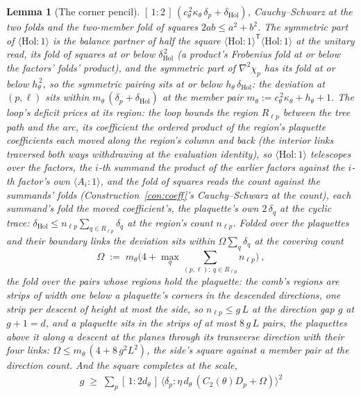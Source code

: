 \documentclass[11pt]{article}
\newtheorem{lemma}{Lemma}
\theoremstyle{definition}
\begin{document}
\begin{lemma}[The corner pencil]
$[\,1:2\,]\,(c_\theta^{\,2}\kappa_\theta\,\delta_p+\delta_{\mathrm{Hol}})$,
Cauchy--Schwarz at the two folds and the two-member fold of squares
$2ab\le a^{2}+b^{2}$. The symmetric part of
$\langle\mathrm{Hol}\!:\!1\rangle$ is the balance partner of half the
square $\langle\mathrm{Hol}\!:\!1\rangle^{\mathsf T}
\langle\mathrm{Hol}\!:\!1\rangle$ at the unitary read, its fold of
squares at or below $\delta_{\mathrm{Hol}}^{\,2}$ (a product's
Frobenius fold at or below the factors' folds' product), and the
symmetric part of $\nabla^{2}\chi_p$ has its fold at or below
$h_\theta^{\,2}$, so the symmetric pairing sits at or below
$h_\theta\,\delta_{\mathrm{Hol}}$: the deviation at $(p,\ell)$ sits
within $m_\theta\,(\delta_p+\delta_{\mathrm{Hol}})$ at the member
pair $m_\theta:=c_\theta^{\,2}\kappa_\theta+h_\theta+1$. The loop's
deficit prices at its region: the loop bounds the region
$R_{\ell p}$ between the tree path and the arc, its coefficient the
ordered product of the region's plaquette coefficients each moved
along the region's column and back (the interior links traversed
both ways withdrawing at the evaluation identity), so
$\langle\mathrm{Hol}\!:\!1\rangle$ telescopes over the factors, the
$i$-th summand the product of the earlier factors against the
$i$-th factor's own $\langle A_i\!:\!1\rangle$, and the fold of
squares reads the count against the summands' folds
(Construction~\ref{con:coeff}'s Cauchy--Schwarz at the count), each
summand's fold the moved coefficient's, the plaquette's own
$2\,\delta_q$ at the cyclic trace:
$\delta_{\mathrm{Hol}}\le n_{\ell p}\sum_{q\in R_{\ell p}}\delta_q$ at
the region's count $n_{\ell p}$. Folded over the plaquettes and
their boundary links the deviation sits within
$\Omega\sum_q\delta_q$ at the \emph{covering count}
\[
\Omega\;:=\;m_\theta\Big(4+\max_q\sum_{(p,\ell):\ q\in R_{\ell p}}
n_{\ell p}\Big)\ ,
\]
the fold over the pairs whose regions hold the plaquette: the comb's
regions are strips of width one below a plaquette's corners in the
descended directions, one strip per descent of height at most the
side, so $n_{\ell p}\le g\,L$ at the direction gap $g$ at $g+1=d$,
and a plaquette sits in the strips of at most $8\,g\,L$ pairs, the
plaquettes above it along a descent at the planes through its
transverse direction with their four links: $\Omega\le
m_\theta\,(4+8\,g^{2}L^{2})$, the side's square against a member
pair at the direction count. And the square completes at the scale,
\begin{gather*}
g\;\ge\;\sum_p[\,1:2d_\theta\,]\,
\big\langle\delta_p\!:\!\eta\,d_\theta\,(C_2(\theta)D_p+\Omega)\big\rangle^{2}

\end{gather*}
\end{lemma}
\end{document}
